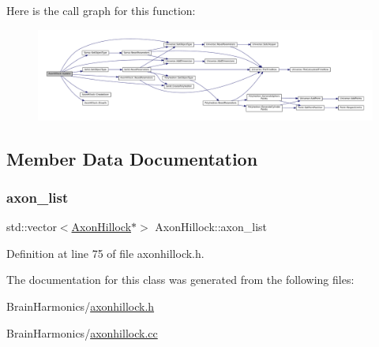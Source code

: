 Here is the call graph for this function\+:\nopagebreak
\begin{figure}[H]
\begin{center}
\leavevmode
\includegraphics[width=350pt]{class_axon_hillock_a5a6a6a93a98b32c303b9ee6320c09909_cgraph}
\end{center}
\end{figure}


\subsection{Member Data Documentation}
\mbox{\label{class_axon_hillock_a110d655ded8e09306b224b6e940cd60b}} 
\subsubsection{\texorpdfstring{axon\+\_\+list}{axon\_list}}
{\footnotesize\ttfamily std\+::vector$<$\mbox{\hyperlink{class_axon_hillock}{Axon\+Hillock}}$\ast$$>$ Axon\+Hillock\+::axon\+\_\+list\hspace{0.3cm}{\ttfamily [protected]}}



Definition at line 75 of file axonhillock.\+h.



The documentation for this class was generated from the following files\+:\begin{DoxyCompactItemize}
\item 
Brain\+Harmonics/\mbox{\hyperlink{axonhillock_8h}{axonhillock.\+h}}\item 
Brain\+Harmonics/\mbox{\hyperlink{axonhillock_8cc}{axonhillock.\+cc}}\end{DoxyCompactItemize}
